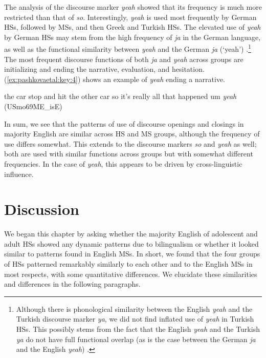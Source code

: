 \documentclass[output=paper,colorlinks,citecolor=brown]{langscibook}
\begin{document}
\textrm{The analysis of the discourse marker} \textrm{\textit{yeah} }\textrm{showed that its frequency is much more restricted than that of} \textrm{\textit{so}}\textrm{. Interestingly,} \textrm{\textit{yeah} }\textrm{is used most frequently by German HSs, followed by MSs, and then Greek and Turkish HSs. The elevated use of} \textrm{\textit{yeah} }\textrm{by German HSs may stem from the high frequency of} \textrm{\textit{ja}} \textrm{in the German language, as well as the}\textrm{ }\textrm{functional similarity between} \textrm{\textit{yeah} }\textrm{and the German} \textrm{\textit{ja}} \textrm{(‘yeah’) \parencite{trotzke2020}.\footnote{Although there is phonological similarity between the English \textit{yeah} and the Turkish discourse marker \textit{ya}, we did not find inflated use of \textit{yeah} in Turkish HSs. This possibly stems from the fact that the English \textit{yeah} and the Turkish \textit{ya} do not have full functional overlap (as is the case between the German \textit{ja} and the English \textit{yeah}) \parencite{Simsek2012}.} The most frequent discourse functions of both} \textrm{\textit{ja}} \textrm{and} \textrm{\textit{yeah}} \textrm{across groups are initializing and ending the narrative, evaluation, and hesitation. (\ref{ex:pashkovaetal:key:4}) shows an example of \textit{yeah} ending a narrative.}

\ea%
\label{ex:pashkovaetal:key:4}
the car stop and hit the other car so it’s really all that happened um \textit{yeah} (USmo69ME\_isE)
\z 

\textrm{In sum, we see that the patterns of use of discourse openings and closings in majority English are similar across HS and MS groups, although the frequency of use differs somewhat. This extends to the discourse markers} \textrm{\textit{so}} \textrm{and} \textrm{\textit{yeah}} \textrm{as well; both are used with similar functions across groups but with somewhat different frequencies. In the case of} \textrm{\textit{yeah}}\textrm{, this appears to be driven by cross-linguistic influence.~}


\section{Discussion} \label{sec:pashkovaetal:Discussion}

We began this chapter by asking whether the majority English of adolescent and adult HSs showed any dynamic patterns due to bilingualism or whether it looked similar to patterns found in English MSs. In short, we found that the four groups of HSs patterned remarkably similarly to each other and to the English MSs in most respects, with some quantitative differences. We elucidate these similarities and differences in the following paragraphs.
\end{document}
